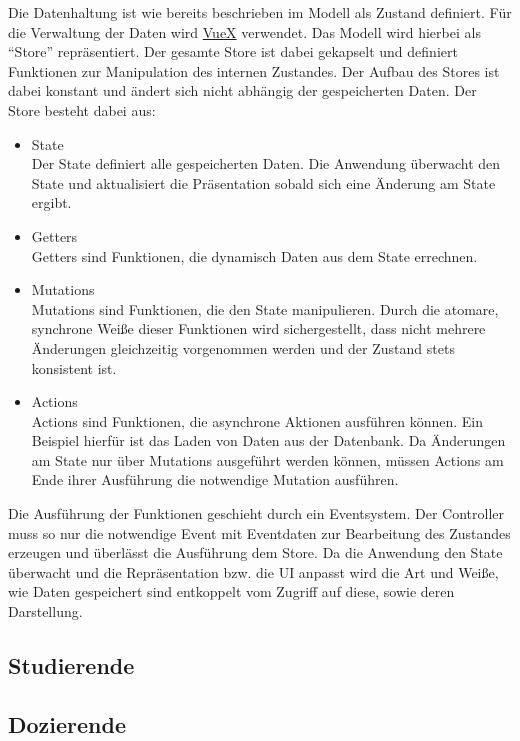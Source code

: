 Die Datenhaltung ist wie bereits beschrieben im Modell als Zustand definiert. Für die Verwaltung der Daten wird \href{https://vuex.vuejs.org/}{VueX} verwendet.
Das Modell wird hierbei als \enquote{Store} repräsentiert.
Der gesamte Store ist dabei gekapselt und definiert Funktionen zur Manipulation des internen Zustandes. Der Aufbau des Stores ist dabei konstant und ändert sich nicht abhängig der gespeicherten Daten.
Der Store besteht dabei aus:
\begin{itemize}
    \item State\\
        Der State definiert alle gespeicherten Daten. Die Anwendung überwacht den State und aktualisiert die Präsentation sobald sich eine Änderung am State ergibt.
    \item Getters\\
        Getters sind Funktionen, die dynamisch Daten aus dem State errechnen.
    \item Mutations\\
        Mutations sind Funktionen, die den State manipulieren.
        Durch die atomare, synchrone Weiße dieser Funktionen wird sichergestellt, dass nicht mehrere Änderungen gleichzeitig vorgenommen werden und der Zustand stets konsistent ist.
    \item Actions\\
        Actions sind Funktionen, die asynchrone Aktionen ausführen können. Ein Beispiel hierfür ist das Laden von Daten aus der Datenbank. Da Änderungen am State nur über Mutations ausgeführt werden können, müssen Actions am Ende ihrer Ausführung die notwendige Mutation ausführen.
\end{itemize}

Die Ausführung der Funktionen geschieht durch ein Eventsystem.
Der Controller muss so nur die notwendige Event mit Eventdaten zur Bearbeitung des Zustandes erzeugen und überlässt die Ausführung dem Store.
Da die Anwendung den State überwacht und die Repräsentation bzw. die UI anpasst wird die Art und Weiße, wie Daten gespeichert sind entkoppelt vom Zugriff auf diese, sowie deren Darstellung.


\subsection{Studierende}
\subsection{Dozierende}
